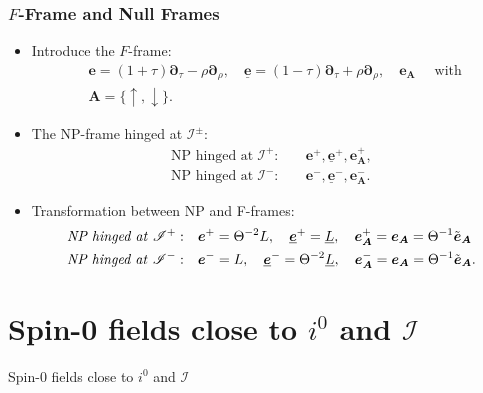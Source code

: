 \documentclass{beamer}
\theoremstyle{remark}
\theoremstyle{plain}
\theoremstyle{plain}
\begin{document}
\begin{frame}
  \frametitle{$F$-Frame and Null Frames}
  \begin{itemize}
    \item Introduce the $F$-frame:
    \begin{align}
      & \boldsymbol{e}=(1+\tau) \boldsymbol{\partial}_\tau-\rho \boldsymbol{\partial}_\rho, \quad \underline{\boldsymbol{e}}=(1-\tau) \boldsymbol{\partial}_\tau+\rho \boldsymbol{\partial}_\rho, \quad \boldsymbol{e}_{\boldsymbol{A}} \quad \text { with } \nonumber \\ 
      & \boldsymbol{A}=\{\uparrow, \downarrow\}.
    \end{align}
    \item The NP-frame hinged at $\mathscr{I}^{\pm}$:
    \begin{align*}
      \text{NP hinged at} \; \mathscr{I}^{+}: & \quad \boldsymbol{e}^{+}, \underline{\boldsymbol{e}}^{+}, \boldsymbol{e}_{\boldsymbol{A}}^{+}, \\
      \text{NP hinged at} \; \mathscr{I}^{-}: & \quad \boldsymbol{e}^{-}, \underline{\boldsymbol{e}}^{-}, \boldsymbol{e}_{\boldsymbol{A}}^{-}.
    \end{align*}
    \item Transformation between NP and F-frames:
    \begin{align*}
      \text{\emph{NP hinged at} $\mathscr{I}^{+}$}:& \quad\boldsymbol{e}^{+} = \Theta^{-2} L, \quad \underline{\boldsymbol{e}}^{+}= \underline{L},\quad \boldsymbol{e}_{\boldsymbol{A}}^{+}= \boldsymbol{e}_{\boldsymbol{A}}= \Theta^{-1}\tilde{\boldsymbol{e}}_{\boldsymbol{A}}\\ \text{\emph{NP hinged at} $\mathscr{I}^{-}$}:& \quad\boldsymbol{e}^{-} =
       L,\quad \underline{\boldsymbol{e}}^{-}=  \Theta^{-2} \underline{L},\quad \boldsymbol{e}_{\boldsymbol{A}}^{-}= \boldsymbol{e}_{\boldsymbol{A}} = \Theta^{-1}\tilde{\boldsymbol{e}}_{\boldsymbol{A}}.
    \end{align*}
  \end{itemize}
\end{frame}

\section{Spin-0 fields close to $i^0$ and $\mathscr{I}$}
\begin{frame}{Spin-0 fields close to $i^0$ and $\mathscr{I}$}
\end{frame}
\end{document}
